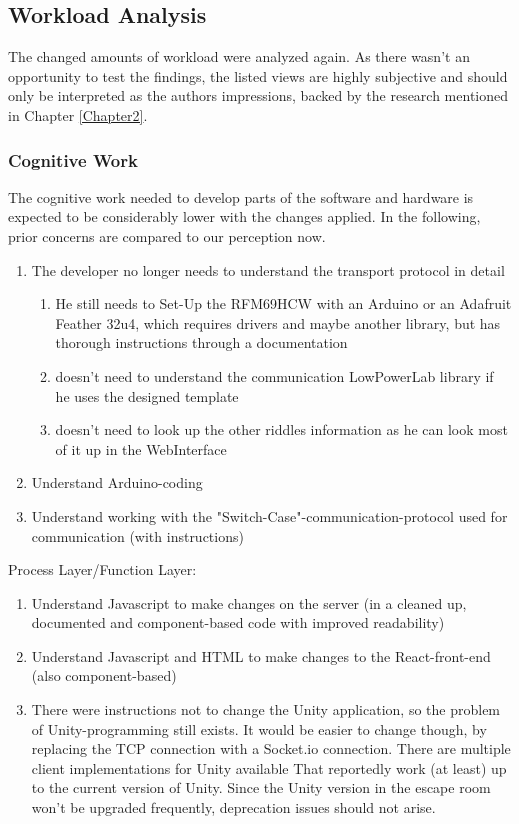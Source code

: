 \subsection{Workload Analysis}
The changed amounts of workload were analyzed again. 
As there wasn't an opportunity to test the findings, the listed views are highly subjective 
and should only be interpreted as the authors impressions, backed by the research mentioned in Chapter \ref{Chapter2}.
\subsubsection{Cognitive Work}
The cognitive work needed to develop parts 
of the software and hardware is expected to be considerably lower with the changes applied.
In the following, prior concerns are compared to our perception now.
\begin{enumerate}
    \item The developer no longer needs to understand the transport protocol in detail
    \begin{enumerate}
        \item 
        He still needs to Set-Up the RFM69HCW with an Arduino or an Adafruit Feather 32u4, 
        which requires drivers and maybe another library, but has thorough instructions through a documentation
        \item doesn't need to understand the communication LowPowerLab library if he uses the designed template
        \item doesn't need to look up the other riddles information as he can look most of it up in the WebInterface
    \end{enumerate}   
    \item Understand Arduino-coding 
    \item Understand working with the "Switch-Case"-communication-protocol used for communication (with instructions)
\end{enumerate}  
Process Layer/Function Layer:
\begin{enumerate}
    \item Understand Javascript to make changes on the server (in a cleaned up, documented and component-based code with improved readability)
    \item Understand Javascript and HTML to make changes to the React-front-end (also component-based) 
    \item     
    There were instructions not to change the Unity application, so the problem of Unity-programming still exists. 
    It would be easier to change though, by replacing the TCP connection with a Socket.io connection. 
    There are multiple client implementations for Unity available \parencite{socketioUnity1, socketioUnity2,socketioUnity3}
    That reportedly work (at least) up to the current version of Unity. 
    Since the Unity version in the escape room won't be upgraded frequently, deprecation issues should not arise.
\end{enumerate}  
